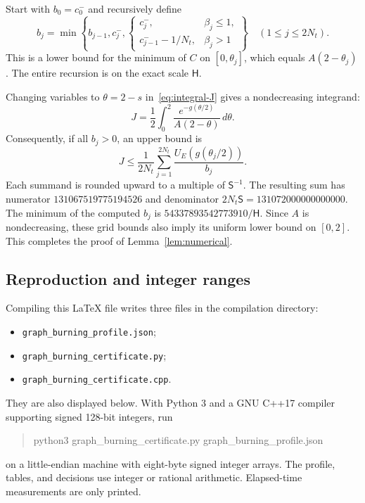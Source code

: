 \documentclass[11pt]{article}
\numberwithin{equation}{section}
\theoremstyle{definition}
\begin{document}
Start with $b_0=c_0^-$ and recursively define
\begin{equation}\label{eq:capacity-recursion}
 b_j=\min\left\{b_{j-1},c_j^-,
 \begin{cases}
 c_j^-,&\beta_j\le1,\\
 c_{j-1}^- -1/N_t,&\beta_j>1
 \end{cases}\right\}\quad(1\le j\le2N_t).
\end{equation}
This is a lower bound for the minimum of $C$ on $[0,\theta_j]$,
which equals $A(2-\theta_j)$.
The entire recursion is on the exact scale $\mathsf H$.

Changing variables to $\theta=2-s$ in~\eqref{eq:integral-J} gives
a nondecreasing integrand:
\[
 J=\frac12\int_0^2\frac{e^{-g(\theta/2)}}{A(2-\theta)}\,d\theta.
\]
Consequently, if all $b_j>0$, an upper bound is
\begin{equation}\label{eq:J-finite-certificate}
 J\le\frac1{2N_t}\sum_{j=1}^{2N_t}
           \frac{U_E(g(\theta_j/2))}{b_j}.
\end{equation}
Each summand is rounded upward to a multiple of $\mathsf S^{-1}$.
The resulting sum has numerator $131067519775194526$ and denominator
$2N_t\mathsf S=131072000000000000$.
The minimum of the computed $b_j$ is
$54337893542773910/\mathsf H$.
Since $A$ is nondecreasing, these grid bounds also imply its uniform
lower bound on $[0,2]$. This completes the proof of
Lemma~\ref{lem:numerical}.

\subsection{Reproduction and integer ranges}

Compiling this LaTeX file writes three files in the compilation
directory:
\begin{itemize}[nosep]
\item \texttt{graph\_burning\_profile.json};
\item \texttt{graph\_burning\_certificate.py};
\item \texttt{graph\_burning\_certificate.cpp}.
\end{itemize}
They are also displayed below.
With Python 3 and a GNU C++17 compiler supporting signed 128-bit
integers, run
\begin{quote}\ttfamily\small
python3 graph\_burning\_certificate.py graph\_burning\_profile.json
\end{quote}
on a little-endian machine with eight-byte signed integer arrays.
The profile, tables, and decisions use integer or rational arithmetic.
Elapsed-time measurements are only printed.
\end{document}
